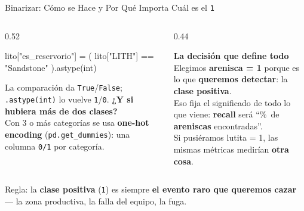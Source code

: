 \documentclass[aspectratio=169, 11pt]{beamer}
\begin{document}
\begin{frame}[fragile,shrink=18]{Binarizar: Cómo se Hace y Por Qué Importa Cuál es el \texttt{1}}
  \vspace{-4pt}
  \begin{columns}[T]
    \begin{column}{0.52\textwidth}
      \begin{pyblock}
lito["es_reservorio"] = (
    lito["LITH"] == "Sandstone"
).astype(int)
      \end{pyblock}
      \vspace{3pt}
      {\scriptsize\color{textMuted}
        La comparación da \texttt{True}/\texttt{False};
        \texttt{.astype(int)} lo vuelve \texttt{1}/\texttt{0}.}
      \vspace{5pt}
      {\scriptsize\color{arcaDark}\bfseries ¿Y si hubiera más de dos clases?}\\[2pt]
      {\scriptsize\color{textMuted}
        Con 3 o más categorías se usa \textbf{one-hot encoding}
        (\texttt{pd.get\_dummies}): una columna \texttt{0/1} por
        categoría.}
    \end{column}
    \begin{column}{0.44\textwidth}
      \begin{tcolorbox}[colback=arcaGray, colframe=arcaRed, boxrule=0pt, leftrule=3pt,
        arc=3pt, left=6pt, right=6pt, top=5pt, bottom=5pt]
        {\scriptsize\color{arcaRed}\bfseries\faExclamationTriangle\hspace{4pt}La decisión que define todo}\\[4pt]
        {\scriptsize\color{textMuted}
          Elegimos \textbf{arenisca = 1} porque es lo que
          \textbf{queremos detectar}: la \textbf{clase positiva}.\\[5pt]
          Eso fija el significado de todo lo que viene:
          \textbf{recall} será ``\%\ de \textbf{areniscas}
          encontradas''.\\[5pt]
          Si pusiéramos lutita = 1, las mismas métricas
          medirían \textbf{otra cosa}.}
      \end{tcolorbox}
    \end{column}
  \end{columns}

  \vspace{4pt}
  {\scriptsize\color{arcaDark}
    \faLightbulb[regular]\hspace{3pt}%
    Regla: la \textbf{clase positiva} (\texttt{1}) es siempre \textbf{el evento raro que queremos cazar}
    --- la zona productiva, la falla del equipo, la fuga.}
\end{frame}
\end{document}
